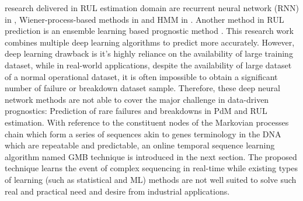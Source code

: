 \documentclass[conference]{IEEEtran}
\begin{document}
research delivered in RUL estimation domain are recurrent neural network (RNN) in \cite{Guo2017}, Wiener-process-based methods in \cite{Zhang2018} and HMM in \cite{Chen2019}. Another method in RUL prediction is an ensemble learning based prognostic method \cite{Li2019b}. This research work combines multiple deep learning algorithms to predict more accurately. However, deep learning drawback is it’s highly reliance on the availability of large training dataset, while in real-world applications, despite the availability of large dataset of a normal operational dataset, it is often impossible to obtain a significant number of failure or breakdown dataset sample. Therefore, these deep neural network methods are not able to cover the major challenge in data-driven prognostics: Prediction of rare failures and breakdowns in PdM and RUL estimation. With reference to the constituent nodes of the Markovian processes chain which form a series of sequences akin to genes terminology in the DNA which are repeatable and predictable, an online temporal sequence learning algorithm named GMB technique is introduced in the next section. The proposed technique learns the event of complex sequencing in real-time while existing types of learning (such as statistical and ML) methods are not well suited to solve such real and practical need and desire from industrial applications.
\end{document}
